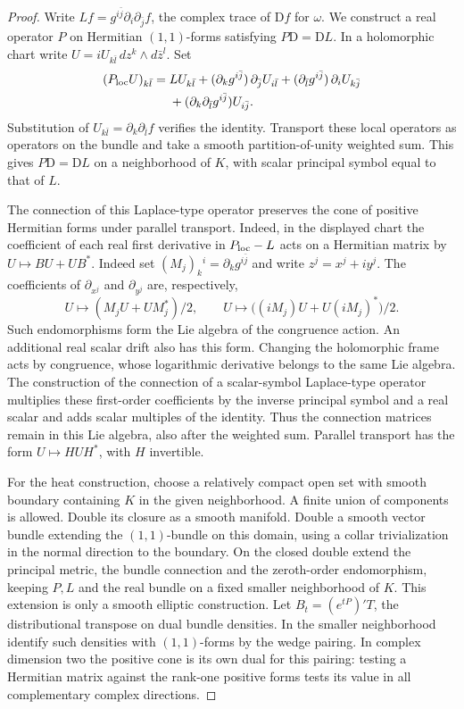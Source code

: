\documentclass[11pt]{amsart}
\theoremstyle{remark}
\numberwithin{equation}{section}
\newcommand{\D}{\mathrm{D}}
\begin{document}
\begin{proof}
Write \(L f=g^{i\bar j}\partial_i\partial_{\bar j}f\), the complex
trace of \(\D f\) for \(\omega\). We construct a real operator \(P\)
on Hermitian \((1,1)\)-forms satisfying \(P\D=\D L\).
In a holomorphic chart write \(U=iU_{k\bar l}\,dz^k\wedge d\bar z^l\).
Set
\begin{align*}
 (P_{\rm loc}U)_{k\bar l}
 ={}& L U_{k\bar l}
 +(\partial_k g^{i\bar j})\,\partial_{\bar j}U_{i\bar l}
 +(\partial_{\bar l}g^{i\bar j})\,\partial_iU_{k\bar j}\\
 &+(\partial_k\partial_{\bar l}g^{i\bar j})U_{i\bar j}.
\end{align*}
Substitution of \(U_{k\bar l}=\partial_k\partial_{\bar l}f\)
verifies the identity. Transport these local operators as operators
on the bundle and take a smooth partition-of-unity weighted sum.
This gives \(P\D=\D L\) on a neighborhood of \(K\), with scalar
principal symbol equal to that of \(L\).

The connection of this Laplace-type operator preserves the cone of
positive Hermitian forms under parallel transport. Indeed, in the
displayed chart the coefficient of each real first derivative in
\(P_{\rm loc}-L\) acts on a Hermitian matrix by
\(U\mapsto B U+ U B^*\). Indeed set
\((M_j)_k{}^i=\partial_k g^{i\bar j}\) and write \(z^j=x^j+iy^j\).
The coefficients of \(\partial_{x^j}\) and \(\partial_{y^j}\) are,
respectively,
\[
 U\longmapsto (M_jU+UM_j^*)/2,\qquad
 U\longmapsto \big((iM_j)U+U(iM_j)^*\big)/2 .
\]
Such endomorphisms form the Lie algebra of the congruence action.
An additional real scalar drift also has this form. Changing the
holomorphic frame acts by congruence, whose logarithmic derivative
belongs to the same Lie algebra. The construction of the connection
of a scalar-symbol Laplace-type operator multiplies these first-order
coefficients by the inverse principal symbol and a real scalar and
adds scalar multiples of the identity. Thus the connection matrices
remain in this Lie algebra, also after the weighted sum. Parallel
transport has the form \(U\mapsto H U H^*\), with \(H\) invertible.

For the heat construction, choose a relatively compact open set with
smooth boundary containing \(K\) in the given neighborhood. A finite
union of components is allowed. Double its closure as a
smooth manifold. Double a smooth vector bundle extending the
\((1,1)\)-bundle on this domain, using a collar trivialization in the
normal direction to the boundary. On the closed double extend the
principal metric, the bundle connection and the zeroth-order
endomorphism, keeping \(P,L\) and the real bundle on a fixed smaller
neighborhood of \(K\). This extension is only a smooth elliptic
construction. Let \(B_t=(e^{tP})'T\), the distributional transpose
on dual bundle densities. In the smaller neighborhood identify such
densities with \((1,1)\)-forms by the wedge pairing. In complex
dimension two the positive cone is its own dual for this pairing:
testing a Hermitian matrix against the rank-one positive forms tests
its value in all complementary complex directions.


\end{proof}
\end{document}
